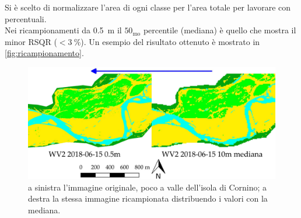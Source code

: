 %
Si è scelto di normalizzare l'area di ogni classe per l'area totale per lavorare con percentuali.
\\
Nei ricampionamenti da \SI{0.5}{\m} il $50_\mathrm{mo}$ percentile (mediana) è quello che mostra il minor RSQR ($<\SI{3}{\percent}$). Un esempio del risultato ottenuto è mostrato in \vref{fig:ricampionamento}.
%
\begin{figure}
	\centering
	\includegraphics[width=\textwidth]{files/ricamp_class_is_fl.jpeg}
	\caption[confronto originale - ricampionamento]{a sinistra l'immagine \WV{} originale, poco a valle dell'isola di Cornino; a destra la stessa immagine ricampionata distribuendo i valori con la mediana.}
	\label{fig:ricampionamento}
\end{figure} 
%


